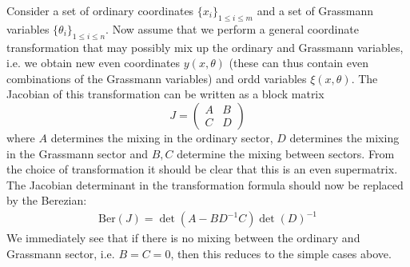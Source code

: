     \qquad Consider a set of ordinary coordinates $\{x_i\}_{1\leq i\leq m}$ and a set of Grassmann variables $\{\theta_i\}_{1\leq i\leq n}$. Now assume that we perform a general coordinate transformation that may possibly mix up the ordinary and Grassmann variables, i.e. we obtain new even coordinates $y(x, \theta)$ (these can thus contain even combinations of the Grassmann variables) and ordd variables $\xi(x, \theta)$. The Jacobian of this transformation can be written as a block matrix \[J=\begin{pmatrix}A&B\\C&D\end{pmatrix}\] where $A$ determines the mixing in the ordinary sector, $D$ determines the mixing in the Grassmann sector and $B, C$ determine the mixing between sectors. From the choice of transformation it should be clear that this is an even supermatrix. The Jacobian determinant in the transformation formula should now be replaced by the Berezian:
    \begin{gather}
        \text{Ber}(J) = \det(A - BD^{-1}C)\det(D)^{-1}
    \end{gather}
    We immediately see that if there is no mixing between the ordinary and Grassmann sector, i.e. $B=C=0$, then this reduces to the simple cases above.